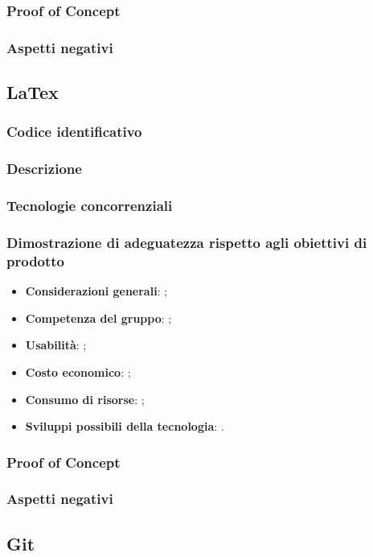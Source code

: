 \documentclass[./../Technology Baseline.tex]{subfiles}
\begin{document}
\subsubsection{Proof of Concept}
\subsubsection{Aspetti negativi}

\subsection{LaTex}

\subsubsection{Codice identificativo}
\subsubsection{Descrizione}
\subsubsection{Tecnologie concorrenziali}
\subsubsection{Dimostrazione di adeguatezza rispetto agli obiettivi di prodotto}
\begin{itemize}
	\item \textbf{Considerazioni generali}: ;
	\item \textbf{Competenza del gruppo}: ;
	\item \textbf{Usabilità}: ;
	\item \textbf{Costo economico}: ;
	\item \textbf{Consumo di risorse}: ;
	\item \textbf{Sviluppi possibili della tecnologia}: .
\end{itemize}
\subsubsection{Proof of Concept}
\subsubsection{Aspetti negativi}

\subsection{Git}
\end{document}
